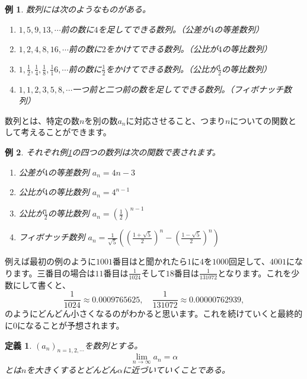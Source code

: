 \documentclass{ltjsarticle}
\newtheorem{definition}{定義}[section]
\newtheorem{example}{例}[section]
\begin{document}
\begin{example}数列には次のようなものがある。
\begin{enumerate}[1).]
\item $1,5,9,13,\cdots$前の数に$4$を足してできる数列。（公差が$4$の等差数列）
\item $1,2,4,8,16,\cdots$前の数に$2$をかけてできる数列。（公比が$4$の等比数列）
\item $1,{\frac 1 2},{\frac 1 4},{\frac 1 8},{\frac 1 16},\cdots$前の数に${\frac 1 2}$をかけてできる数列。（公比が${\frac 1 2}$の等比数列）
\item $1,1,2,3,5,8,\cdots$一つ前と二つ前の数を足してできる数列。（フィボナッチ数列）
\end{enumerate}
\label{example_sequences}
\end{example}

数列とは、特定の数$n$を別の数$a_n$に対応させること、つまり$n$についての関数として考えることができます。
\begin{example}それぞれ例\ref{example_sequences}の四つの数列は次の関数で表されます。
\begin{enumerate}[1).]
\item 公差が$4$の等差数列 $a_n = 4n-3$
\item 公比が$4$の等比数列 $a_n = 4^{n-1}$
\item 公比が${\frac 1 2}$の等比数列 $a_n = \left({\frac 1 2}\right)^{n-1}$
\item フィボナッチ数列 $a_n = {\frac 1 {\sqrt{5}}}\left(\left({\frac {1+\sqrt{5}} 2}\right)^n-\left({\frac {1-\sqrt{5}} 2}\right)^n\right)$
\end{enumerate}
\end{example}

例えば最初の例のように$1001$番目はと聞かれたら$1$に$4$を$1000$回足して、$4001$になります。三番目の場合は$11$番目は${\frac 1 {1024}}$そして$18$番目は${\frac 1 {131072}}$となります。これを少数にして書くと、
\begin{equation*}
{\frac 1 {1024}}\approx0.0009765625,\quad{\frac 1{131072}} \approx 0.00000762939,
\end{equation*}
のようにどんどん小さくなるのがわかると思います。これを続けていくと最終的に$0$になることが予想されます。

\begin{definition}
$(a_n)_{n=1,2,\cdots}$を数列とする。
\begin{equation*}
\lim_{n\to\infty} a_n = \alpha
\end{equation*}
とは$n$を大きくするとどんどん$\alpha$に近づいていくことである。
\end{definition}
\end{document}
